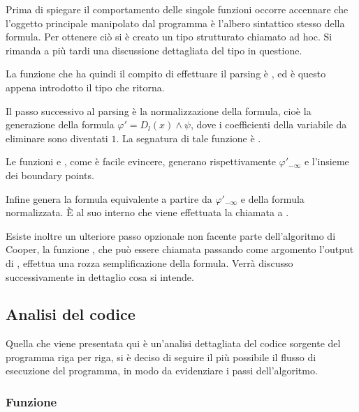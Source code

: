 \documentclass[11pt,letterpaper,twoside]{article}
\begin{document}
Prima di spiegare il comportamento delle singole funzioni occorre accennare che
l'oggetto principale manipolato dal programma è l'albero sintattico stesso della
formula. Per ottenere ciò si è creato un tipo strutturato chiamato
 ad hoc. Si rimanda a più tardi una discussione dettagliata
del tipo in questione.

La funzione che ha quindi il compito di effettuare il parsing è
, ed è questo appena introdotto il tipo
che ritorna.

Il passo successivo al parsing è la normalizzazione della formula, cioè la
generazione della formula $\varphi' = D_l(x) \land \psi$, dove i coefficienti
della variabile da eliminare sono diventati $1$. La segnatura di tale funzione è
.

Le funzioni  e
\newline {},
come è facile evincere, generano rispettivamente $\varphi' _{- \infty}$ e
l'insieme dei boundary points.

Infine  genera la formula equivalente a partire da $\varphi '_{- \infty}$ e
della formula normalizzata. \`E al suo interno che viene effettuata la chiamata
a .

Esiste inoltre un ulteriore passo opzionale non facente parte dell'algoritmo di
Cooper, la funzione , che può essere
chiamata passando come argomento l'output di , effettua una
rozza semplificazione della formula. Verrà discusso successivamente in dettaglio
cosa si intende.

\subsection{Analisi del codice} Quella che viene presentata qui è un'analisi
dettagliata del codice sorgente del programma riga per riga, si è deciso di
seguire il più possibile il flusso di esecuzione del programma, in modo da
evidenziare i passi dell'algoritmo.

\subsubsection{Funzione } 
\end{document}
